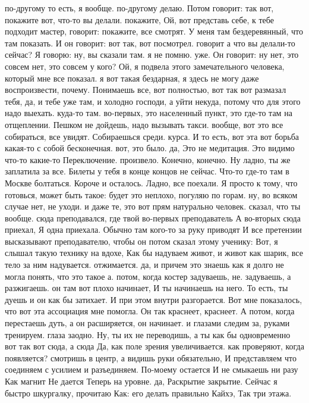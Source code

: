 по-другому то есть, я вообще.
по-другому делаю.
Потом говорит: так вот, покажите вот, что-то вы делали. покажите, Ой, вот представь себе, к тебе подходит мастер, говорит: покажите, все смотрят.
У меня там бездеревянный, что там показать.
И он говорит: вот так, вот посмотрел. говорит а что вы делали-то сейчас?
Я говорю: ну, вы сказали там.
я не помню.
уже.
Он говорит: ну нет, это совсем нет, это совсем у кого? Ой, я подвела этого замечательного человека, который мне все показал. я вот такая бездарная, я здесь не могу даже воспроизвести, почему.
Понимаешь все, вот полностью, вот так вот размазал тебя, да, и тебе уже там, и холодно господи, а уйти некуда, потому что для этого надо выехать.
куда-то там. во-первых, это населенный пункт, это где-то там на отщеплении.
Пешком не дойдешь, надо вызывать такси. вообще, вот это все собираться, все увидят.
Собираешься среди.
курса. И то есть, вот эта вот борьба какая-то с собой бесконечная.
вот, это было. да, Это не медитация.
Это видимо что-то какие-то Переключение.
произвело.
Конечно, конечно.
Ну ладно, ты же заплатила за все.
Билеты у тебя в конце концов не сейчас.
Что-то где-то там в Москве болтаться.
Короче и осталось.
Ладно, все поехали.
Я просто к тому, что готовься, может быть такое:
будет это неплохо, погуляю по горам. ну, во всяком случае нет, не уходи. и даже те, это вот прям натурально человек.
сказал, что ты вообще.
сюда преподавался, где твой во-первых преподаватель А во-вторых
сюда приехал, Я одна приехала.
Обычно там кого-то за руку приводят И все претензии высказывают преподавателю, чтобы он потом сказал этому ученику: Вот, я слышал такую технику на вдохе, Как бы надуваем живот, и живот как шарик, все тело за ним надувается.
отжимается. да, и причем это знаешь как я долго не могла понять, что это такое а.
потом, когда костер задуваешь, не.
задуваешь, а разжигаешь. он там вот плохо начинает, И ты начинаешь на него.
То есть, ты дуешь и он как бы затихает.
И при этом внутри разгорается. Вот мне показалось, что вот эта ассоциация мне помогла.
Он так краснеет, краснеет.
А потом, когда перестаешь дуть, а он расширяется, он начинает.
и глазами следим за, руками тренируем.
глаза заодно. Ну, ты их не переводишь, а ты как бы одновременно вот так вот сюда, а сюда Да, как поле зрения увеличивается.
как проверяют, когда появляется?
смотришь в центр, а видишь руки обязательно, И представляем что соединяем с усилием и разъединяем.
По-моему остается И не смыкаешь ни разу Как магнит Не дается Теперь на уровне.
да, Раскрытие закрытие. Сейчас я быстро шкургалку, прочитаю Как:
его делать правильно Кайхэ, Так три этажа.
